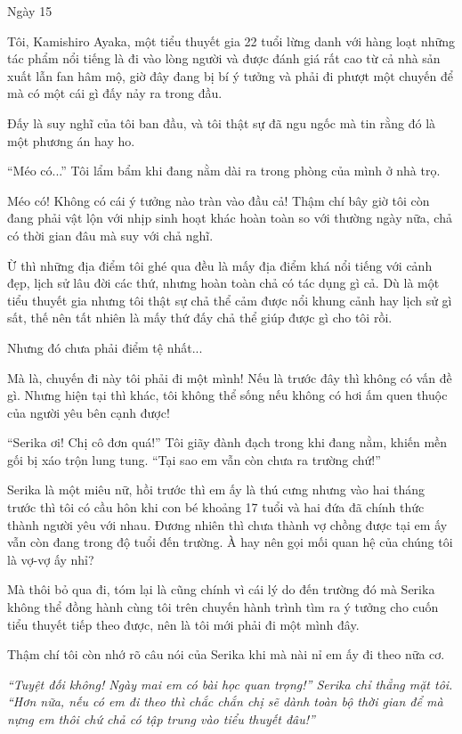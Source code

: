 {Ngày 15}
{
Tôi, Kamishiro Ayaka, một tiểu thuyết gia 22 tuổi lừng danh với hàng
loạt những tác phẩm nổi tiếng là đi vào lòng người và được đánh giá rất
cao từ cả nhà sản xuất lẫn fan hâm mộ, giờ đây đang bị bí ý tưởng và
phải đi phượt một chuyến để mà có một cái gì đấy nảy ra trong đầu.

Đấy là suy nghĩ của tôi ban đầu, và tôi thật sự đã ngu ngốc mà tin rằng
đó là một phương án hay ho.

``Méo có...'' Tôi lẩm bẩm khi đang nằm dài ra trong phòng của mình ở nhà
trọ.

Méo có! Không có cái ý tưởng nào tràn vào đầu cả! Thậm chí bây giờ tôi
còn đang phải vật lộn với nhịp sinh hoạt khác hoàn toàn so với thường
ngày nữa, chả có thời gian đâu mà suy với chả nghĩ.

Ừ thì những địa điểm tôi ghé qua đều là mấy địa điểm khá nổi tiếng với
cảnh đẹp, lịch sử lâu đời các thứ, nhưng hoàn toàn chả có tác dụng gì
cả. Dù là một tiểu thuyết gia nhưng tôi thật sự chả thể cảm được nổi
khung cảnh hay lịch sử gì sất, thế nên tất nhiên là mấy thứ đấy chả thể
giúp được gì cho tôi rồi.

Nhưng đó chưa phải điểm tệ nhất...

Mà là, chuyến đi này tôi phải đi một mình! Nếu là trước đây thì không có
vấn đề gì. Nhưng hiện tại thì khác, tôi không thể sống nếu không có hơi
ấm quen thuộc của người yêu bên cạnh được!

``Serika ơi! Chị cô đơn quá!'' Tôi giãy đành đạch trong khi đang nằm,
khiến mền gối bị xáo trộn lung tung. ``Tại sao em vẫn còn chưa ra trường
chứ!''

Serika là một miêu nữ, hồi trước thì em ấy là thú cưng nhưng vào hai
tháng trước thì tôi có cầu hôn khi con bé khoảng 17 tuổi và hai đứa đã
chính thức thành người yêu với nhau. Đương nhiên thì chưa thành vợ chồng
được tại em ấy vẫn còn đang trong độ tuổi đến trường. À hay nên gọi mối
quan hệ của chúng tôi là vợ-vợ ấy nhỉ?

Mà thôi bỏ qua đi, tóm lại là cũng chính vì cái lý do đến trường đó mà
Serika không thể đồng hành cùng tôi trên chuyến hành trình tìm ra ý
tưởng cho cuốn tiểu thuyết tiếp theo được, nên là tôi mới phải đi một
mình đây.

Thậm chí tôi còn nhớ rõ câu nói của Serika khi mà nài nỉ em ấy đi theo
nữa cơ.

\emph{``Tuyệt đối không! Ngày mai em có bài học quan trọng!'' Serika chỉ
    thẳng mặt tôi. ``Hơn nữa, nếu có em đi theo thì chắc chắn chị sẽ dành
    toàn bộ thời gian để mà nựng em thôi chứ chả có tập trung vào tiểu
    thuyết đâu!''}

}
